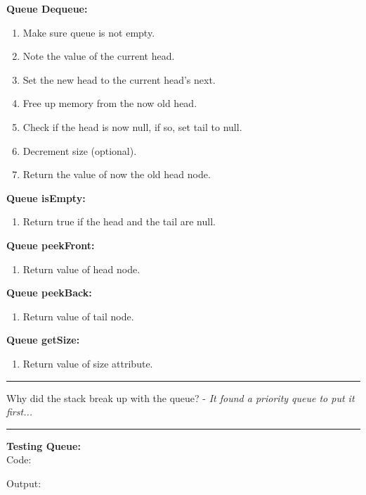 \documentclass[letterpaper, 10pt]{article}
\begin{document}
\textbf{Queue Dequeue:}
\begin{enumerate}
    \item Make sure queue is not empty.
    \item Note the value of the current head.
    \item Set the new head to the current head's next.
    \item Free up memory from the now old head.
    \item Check if the head is now null, if so, set tail to null.
    \item Decrement size (optional). 
    \item Return the value of now the old head node.
\end{enumerate}


\textbf{Queue isEmpty:}
\begin{enumerate}
    \item Return true if the head and the tail are null.
\end{enumerate}
\textbf{Queue peekFront:}
\begin{enumerate}
    \item Return value of head node.
\end{enumerate}
\textbf{Queue peekBack:}
\begin{enumerate}
    \item Return value of tail node.
\end{enumerate}
\textbf{Queue getSize:}
\begin{enumerate}
    \item Return value of size attribute.
\end{enumerate}

\hrule
\vspace{.25cm}
Why did the stack break up with the queue? - \textit{It found a priority queue to put it first...}\\
\hrule
\vspace{.25cm}
\textbf{Testing Queue: } \\ 
Code:

Output:

\end{document}
